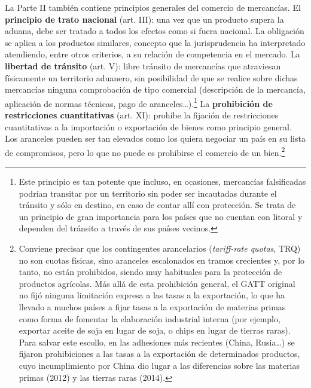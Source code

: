 \documentclass[10pt,a4paper]{article}
\begin{document}
La Parte II también contiene principios generales del comercio de mercancías. El \textbf{principio de trato nacional} (art. III): una vez que un producto supera la aduana, debe ser tratado a todos los efectos como si fuera nacional. La obligación se aplica a los productos similares, concepto que la jurisprudencia ha interpretado atendiendo, entre otros criterios, a su relación de competencia en el mercado. La \textbf{libertad de tránsito} (art. V): libre tránsito de mercancías que atraviesan físicamente un territorio aduanero, sin posibilidad de que se realice sobre dichas mercancías ninguna comprobación de tipo comercial (descripción de la mercancía, aplicación de normas técnicas, pago de aranceles\ldots).\footnote{%
  Este principio es tan potente que incluso, en ocasiones, mercancías falsificadas podrían transitar por un territorio sin poder ser incautadas durante el tránsito y sólo en destino, en caso de contar allí con protección. Se trata de un principio de gran importancia para los países que no cuentan con litoral y dependen del tránsito a través de sus países vecinos.
} La \textbf{prohibición de restricciones cuantitativas} (art. XI): prohíbe la fijación de restricciones cuantitativas a la importación o exportación de bienes como principio general. Los aranceles pueden ser tan elevados como los quiera negociar un país en su lista de compromisos, pero lo que no puede es prohibirse el comercio de un bien.\footnote{%
  Conviene precisar que los contingentes arancelarios (\textit{tariff-rate quotas}, TRQ) no son cuotas físicas, sino aranceles escalonados en tramos crecientes y, por lo tanto, no están prohibidos, siendo muy habituales para la protección de productos agrícolas. Más allá de esta prohibición general, el GATT original no fijó ninguna limitación expresa a las tasas a la exportación, lo que ha llevado a muchos países a fijar tasas a la exportación de materias primas como forma de fomentar la elaboración industrial interna (por ejemplo, exportar aceite de soja en lugar de soja, o chips en lugar de tierras raras). Para salvar este escollo, en las adhesiones más recientes (China, Rusia\ldots) se fijaron prohibiciones a las tasas a la exportación de determinados productos, cuyo incumplimiento por China dio lugar a las diferencias sobre las materias primas (2012) y las tierras raras (2014).
}
\end{document}

